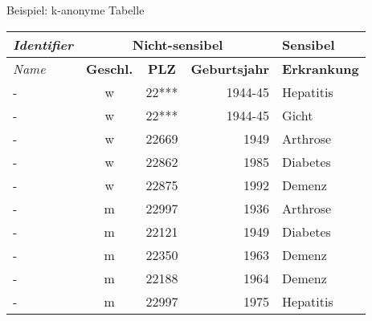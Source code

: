 \begin{frame}{Beispiel: k-anonyme Tabelle}
	\begin{center}
		\begin{tabular}{|l|c|c|r|l|}
		\hline \textit{Identifier} & \multicolumn{3}{c|}{\textbf{Nicht-sensibel}} & \textbf{Sensibel} \\ 
		\hline \textit{Name} & \textbf{Geschl.} & \textbf{PLZ} & \textbf{Geburtsjahr} & \textbf{Erkrankung} \\ \hline
		\hline \rowcolor{svshellblau1!30} - & w & 22*** & 1944-45 & Hepatitis \\ 
		\hline \rowcolor{svshellblau1!30} - & w & 22*** & 1944-45 & Gicht \\
		\hline - & w & 22669 & 1949 & Arthrose \\ 
		\hline - & w & 22862 & 1985 & Diabetes \\ 
		\hline - & w & 22875 & 1992 & Demenz \\  
		\hline - & m & 22997 & 1936 & Arthrose \\ 
		\hline - & m & 22121 & 1949 & Diabetes \\ 
		\hline - & m & 22350 & 1963 & Demenz \\ 
		\hline - & m & 22188 & 1964 & Demenz \\ 
		\hline - & m & 22997 & 1975 & Hepatitis \\ 
		\hline 
		\end{tabular}
	\end{center}
\end{frame}

